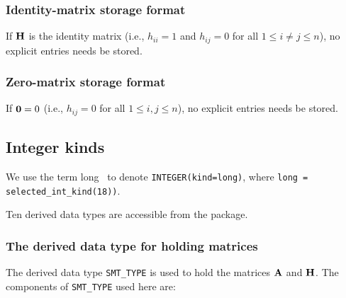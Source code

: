 \documentclass{galahad}
\begin{document}
\subsubsection{Identity-matrix storage format}\label{identity}
If ${\mathbf{H}}$ is the identity matrix
(i.e., $h_{ii} = 1$ and $h_{ij} = 0$ for all $1 \leq i \neq j \leq n$),
no explicit entries needs be stored.

\subsubsection{Zero-matrix storage format}\label{zero}
If ${\mathbf{0}} = 0$ (i.e., $h_{ij} = 0$ for all $1 \leq i, j \leq n$),
no explicit entries needs be stored.


\subsection{Integer kinds}\label{Integer kinds}
We use the term
long \integer\ to denote {\tt INTEGER\-(kind=long)}, where
{\tt long = selected\_int\_kind(18))}.





\galtypes
Ten derived data types are accessible from the package.


\subsubsection{The derived data type for holding matrices}\label{typesmt}
The derived data type {\tt SMT\_TYPE} is used to hold the matrices ${\mathbf{A}}$
and ${\mathbf{H}}$.
The components of {\tt SMT\_TYPE} used here are:
\end{document}

